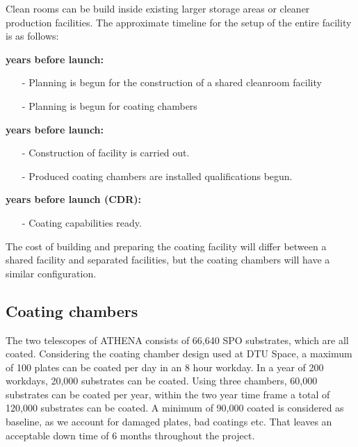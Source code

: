 Clean rooms can be build inside existing larger storage areas or cleaner production facilities. The approximate timeline for the setup of the entire facility is as follows:

\begin{description}[itemsep=1.5pt,parsep=1pt]
	\item[9] \textbf{years before launch:}
		\begin{itemize}[itemsep=1.5pt,parsep=1pt]
		\item[-] Planning is begun for the construction of a shared cleanroom facility
		\item[-] Planning is begun for coating chambers
		\end{itemize}
	\item[7-8] \textbf{years before launch:}
		\begin{itemize}[itemsep=1.5pt,parsep=1pt]
		\item[-] Construction of facility is carried out.
		\item[-] Produced coating chambers are installed qualifications begun.
		\end{itemize}
	\item[6] \textbf{years before launch (CDR):}
		\begin{itemize}[itemsep=1.5pt,parsep=1pt]
		\item[-] Coating capabilities ready.
		\end{itemize}
\end{description}

The cost of building and preparing the coating facility will differ between a shared facility and separated facilities, but the coating chambers will have a similar configuration.

\subsection{Coating chambers}\label{sec:chambers}
The two telescopes of ATHENA consists of 66,640 SPO substrates, which are all coated. Considering the coating chamber design used at DTU Space, a maximum of 100 plates can be coated per day in an 8 hour workday. In a year of 200 workdays, 20,000 substrates can be coated. Using three chambers, 60,000 substrates can be coated per year, within the two year time frame a total of 120,000 substrates can be coated. A minimum of 90,000 coated is considered as baseline, as we account for damaged plates, bad coatings etc. That leaves an acceptable down time of 6 months throughout the project.

